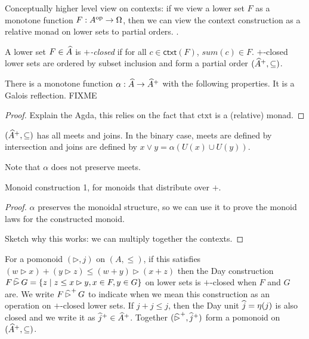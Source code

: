 \begin{remark}
  Conceptually higher level view on contexts: if we view a lower set
  $F$ as a monotone function $F : A^{\mathrm{op}} \to \Omega$, then we can view
  the context construction as a relative monad on lower sets to
  partial orders.  .
\end{remark}

\begin{definition}
  A lower set $F \in \widehat{A}$ is \emph{$+$-closed} if for all
  $c \in \mathsf{ctxt}(F)$, $\mathit{sum}(c) \in F$. $+$-closed lower
  sets are ordered by subset inclusion and form a partial order
  $(\widehat{A}^+, \subseteq)$.
\end{definition}

\begin{proposition}
  There is a monotone function
  $\alpha : \widehat{A} \to \widehat{A}^+$ with the following
  properties. It is a Galois reflection. FIXME
\end{proposition}

\begin{proof}
  Explain the Agda, this relies on the fact that $\mathrm{ctxt}$ is a
  (relative) monad.
\end{proof}

\begin{proposition}
  $(\widehat{A}^+, \subseteq)$ has all meets and joins. In the
  binary case, meets are defined by intersection and joins are defined
  by $x \lor y = \alpha (U(x) \cup U(y))$.
\end{proposition}

\begin{remark}
  Note that $\alpha$ does not preserve meets.
\end{remark}

\begin{proposition}\label{prop:closed-monoid-distrib}
  Monoid construction 1, for monoids that distribute over $+$.
\end{proposition}

\begin{proof}
  $\alpha$ preserves the monoidal structure, so we can use it to prove
  the monoid laws for the constructed monoid.

  Sketch why this works: we can multiply together the contexts.
\end{proof}

\begin{proposition}\label{prop:closed-monoid-duoidal}
  For a pomonoid $(\rhd, j)$ on $(A, \leq)$, if this satisfies
  $(w \rhd x) + (y \rhd z) \leq (w + y) \rhd (x + z)$ then the Day
  construction
  $F \mathop{\widehat{\rhd}} G = \{ z \mid z \leq x \rhd y, x \in F, y \in G \}$ on
  lower sets is $+$-closed when $F$ and $G$ are. We write
  $F \mathop{\widehat{\rhd}^+} G$ to indicate when we mean this construction as
  an operation on $+$-closed lower sets. If $j + j \leq j$, then the
  Day unit $\mathop{\widehat{j}} = \eta(j)$ is also closed and we write it as
  $\mathop{\widehat{j}^+} \in \widehat{A}^+$. Together
  $(\mathop{\widehat{\rhd}^+}, \mathop{\widehat{j}^+})$ form a pomonoid on
  $(\widehat{A}^+, \subseteq)$.
\end{proposition}

